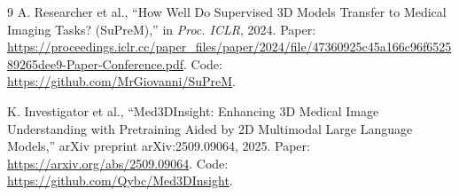 \documentclass[11pt]{article}
\begin{document}
\begin{thebibliography}{9}
A. Researcher et al., ``How Well Do Supervised 3D Models Transfer to Medical Imaging Tasks? (SuPreM),'' in \textit{Proc. ICLR}, 2024. Paper: \url{https://proceedings.iclr.cc/paper_files/paper/2024/file/47360925c45a166c96f652589265dee9-Paper-Conference.pdf}. Code: \url{https://github.com/MrGiovanni/SuPreM}.

K. Investigator et al., ``Med3DInsight: Enhancing 3D Medical Image Understanding with Pretraining Aided by 2D Multimodal Large Language Models,'' arXiv preprint arXiv:2509.09064, 2025. Paper: \url{https://arxiv.org/abs/2509.09064}. Code: \url{https://github.com/Qybc/Med3DInsight}.

\end{thebibliography}
\end{document}
